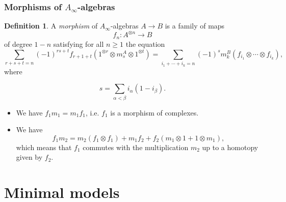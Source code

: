 \documentclass{beamer}
\theoremstyle{definition}
\newtheorem{defi}{Definition}
\begin{document}
\begin{frame}
\frametitle{Morphisms of $A_\infty$-algebras}
\begin{defi}
A \emph{morphism} of $A_\infty$-algebras $A\to B$ is a family of maps \[f_n:A^{\otimes n}\to B\] of degree $1-n$ satisfying for all $n\geq 1$ the equation
\[\sum_{r+s+t=n} (-1)^{rs+t}f_{r+1+t}(1^{\otimes r} \otimes m^A_s\otimes 1^{\otimes t})=\sum_{i_1+\cdots+i_k=n} (-1)^s m^B_k(f_{i_1}\otimes\cdots\otimes f_{i_k}),\]
where

\[s=\sum_{\alpha<\beta}i_\alpha(1-i_\beta).\]
%
\end{defi}

\end{frame}
\begin{frame}
\begin{itemize}
\item<1-> We have $f_1m_1 = m_1f_1$, i.e. $f_1$ is a morphism of complexes.
\item<2-> We have
\[
f_1m_2 = m_2 (f_1\otimes f_1) + m_1f_2 + f_2 (m_1\otimes 1 + 1\otimes m_1),\]
which means that $f_1$ commutes with the multiplication $m_2$ up to a homotopy
given by $f_2$.
\end{itemize}
\end{frame}

\section{Minimal models}

%
\end{document}
